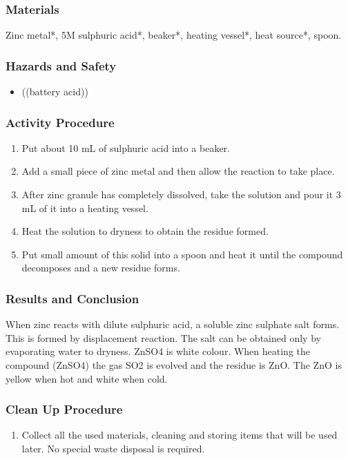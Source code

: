 \subsubsection*{Materials}
Zinc metal*, 5M sulphuric acid*, beaker*, heating vessel*, heat source*, spoon.

\subsubsection*{Hazards and Safety}
\begin{itemize}
\item{((battery acid))}
\end{itemize}

\subsubsection*{Activity Procedure}
\begin{enumerate}
\item{Put about 10 mL of sulphuric acid into a beaker.}
\item{Add a small piece of zinc metal and then allow the reaction to take place.}
\item{After zinc granule has completely dissolved, take the solution and pour it 3 mL of it into a heating vessel.}
\item{Heat the solution to dryness to obtain the residue formed.}
\item{Put small amount of this solid into a spoon and heat it until the compound decomposes and a new residue forms.}
\end{enumerate}

\subsubsection*{Results and Conclusion}
When zinc reacts with dilute sulphuric acid, a soluble zinc sulphate salt forms. This is formed by displacement reaction. The salt can be obtained only by evaporating water to dryness. ZnSO4 is white colour. When heating the compound (ZnSO4) the gas SO2 is evolved and the residue is ZnO. The ZnO is yellow when hot and white when cold.

\subsubsection*{Clean Up Procedure}
\begin{enumerate}
\item{Collect all the used materials, cleaning and storing items that will be used later. No special waste disposal is required.}
\end{enumerate}

